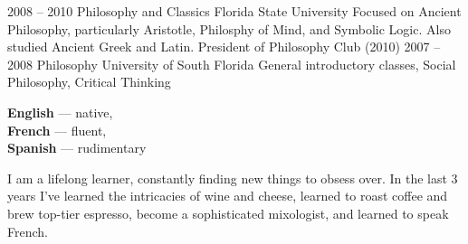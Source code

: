 \documentclass[9pt]{developercv} %
\begin{document}


\begin{entrylist}
    \entry
    {2008 -- 2010}
    {Philosophy and Classics}
    {Florida State University}
    {Focused on Ancient Philosophy, particularly Aristotle, Philosphy of
        Mind, and Symbolic Logic. Also studied Ancient Greek and Latin.
    President of Philosophy Club (2010)}
    \entry
    {2007 -- 2008}
    {Philosophy}
    {University of South Florida}
    {General introductory classes, Social Philosophy, Critical Thinking}
\end{entrylist}

%
\begin{minipage}[t]{0.2\textwidth}
    \vspace{-\baselineskip} %


    \textbf{English} — native,\\
    \textbf{French} — fluent,\\
    \textbf{Spanish} — rudimentary

\end{minipage}
\hfill
\begin{minipage}[t]{0.7\textwidth}
    \vspace{-\baselineskip} %


    I am a lifelong learner, constantly finding new things to obsess over. In
    the last 3 years I've learned the intricacies of wine and cheese, learned to
    roast coffee and brew top-tier espresso, become a sophisticated mixologist,
    and learned to speak French.
\end{minipage}
%
%

\end{document}
